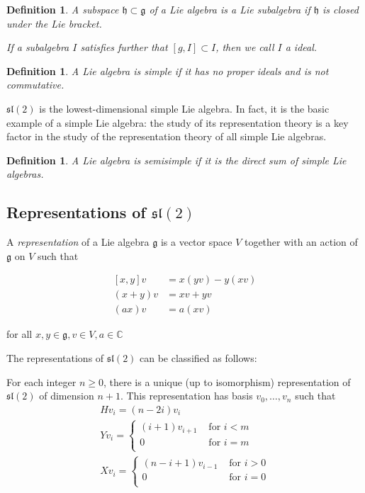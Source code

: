 \documentclass[]{article}
\newtheorem{defn}[theorem]{Definition}
\newcommand{\sll}{\mathfrak{sl}}
\numberwithin{equation}{subsection}
\begin{document}
\begin{defn}
    A subspace $\mathfrak{h} \subset \mathfrak{g}$ of a Lie algebra is a \emph{Lie subalgebra} if $\mathfrak{h}$ is closed under the Lie bracket. 

    If a subalgebra $I$ satisfies further that $[g,I] \subset I$, then we call $I$ a \emph{ideal}.
\end{defn}

\begin{defn}
    A Lie algebra is \emph{simple} if it has no proper ideals and is not commutative. 
\end{defn}

$\sll(2)$ is the lowest-dimensional simple Lie algebra. In fact, it is the
basic example of a simple Lie algebra: the study of its representation theory
is a key factor in the study of the representation theory of all simple Lie
algebras.

\begin{defn}
    A Lie algebra is \emph{semisimple} if it is the direct sum of simple Lie algebras.
\end{defn}

\subsection{Representations of $\sll(2)$}

A \emph{representation} of a Lie algebra $\mathfrak{g}$ is a vector space $V$ together with an action of $\mathfrak{g}$ on $V$ such that 

\begin{align*}
    \left[ x,y \right] v &= x(yv) - y(xv) \\
    (x+y)v &= xv + yv \\
    (ax)v &= a(xv)
\end{align*}

for all $x,y \in \mathfrak{g}, v \in V, a \in \mathbb{C}$

The representations of $\sll(2)$ can be classified as follows: 

For each integer $n \geq 0$, there is a unique (up to isomorphism) representation of $\sll(2)$ of dimension $n+1$. This representation has basis $v_0, \ldots, v_{n}$ such that
\begin{align*}
    &H v_i = (n - 2i) v_i& \\
    &Y v_i = \begin{cases} 
                (i+1)v_{i+1}& \text{ for $i < m$} \\
                0& \text{ for $i = m$} \\
            \end{cases} \\
    &X v_i = \begin{cases} 
                (n-i+1)v_{i-1}& \text{ for $i > 0$} \\
                0& \text{ for $i = 0$} \\
            \end{cases}
\end{align*}
\end{document}
